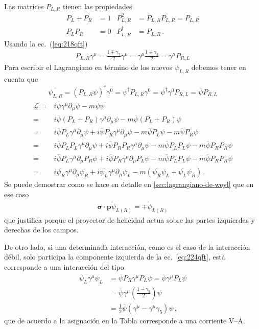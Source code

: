 Las matrices $P_{L,R}$ tienen las propiedades
\begin{align}
  P_L+P_R&=1 & P_{L,R}^2&=P_{L,R}P_{L,R}=P_{L,R}\nonumber\\
  P_L P_R&=0& P_{L,R}^\dagger&=P_{L,R}\,.
\end{align}
Usando la ec.~(\ref{eq:218qft})
\begin{align}
  P_{L,R}\gamma^\mu=\frac{1\mp\gamma_5}{2}\gamma^\mu=\gamma^\mu\frac{1\pm\gamma_5}{2}=\gamma^\mu P_{R,L}
\end{align}
Para escribir el Lagrangiano en término de los nuevos $\psi_{L,R}$ debemos tener en cuenta que
\begin{align}
  \overline{\psi_{L,R}}=(P_{L,R}\psi)^\dagger\gamma^0=\psi^\dagger P_{L,R}\gamma^0=\psi^\dagger\gamma^0P_{R,L}=\overline{\psi}P_{R,L}
\end{align}
\begin{align}
  \label{eq:221qft}
  \mathcal{L}=&i\overline{\psi}\gamma^\mu\partial_\mu\psi-m\overline{\psi}\psi\nonumber\\
  =&i\overline{\psi}(P_L+P_R)\gamma^\mu\partial_\mu\psi-m\overline{\psi}(P_L+P_R)\psi\nonumber\\
  =&i\overline{\psi}P_L\gamma^\mu\partial_\mu\psi+i\overline{\psi}P_R\gamma^\mu\partial_\mu\psi-m\overline{\psi}P_L\psi-m\overline{\psi}P_R\psi\nonumber\\
  =&i\overline{\psi}P_L P_L\gamma^\mu\partial_\mu\psi+i\overline{\psi}P_R P_R\gamma^\mu\partial_\mu\psi-m\overline{\psi}P_L P_L\psi-m\overline{\psi}P_R P_R\psi\nonumber\\
  =&i\overline{\psi}P_L\gamma^\mu\partial_\mu P_R\psi+i\overline{\psi}P_R\gamma^\mu\partial_\mu P_L\psi-m\overline{\psi}P_L P_L\psi-m\overline{\psi}P_R P_R\psi\nonumber\\
  =&i\overline{\psi_R}\gamma^\mu\partial_\mu\psi_R+i\overline{\psi_L}\gamma^\mu\partial_\mu\psi_L-m(\overline{\psi_R}\psi_L+\overline{\psi_L}\psi_R)\,.
\end{align}
Se puede demostrar como se hace en detalle en \ref{sec:lagrangiano-de-weyl} que en ese caso
\begin{align*}
   \boldsymbol{\sigma}\cdot \mathbf{p}\widetilde{\psi}_{L(R)}=\mp \widetilde{\psi}_{L(R)}
\end{align*}
que justifica porque el proyector de helicidad actua sobre las partes izquierdas y derechas de los campos.

De otro lado, si una determinada interacción, como es el caso de la interacción débil, solo participa la componente izquierda de la ec.~\eqref{eq:224qft}, está corresponde a una interacción del tipo
\begin{align}
  \overline{\psi}_L\gamma^\mu\psi_L&=\overline{\psi}P_R\gamma^\mu P_L\psi=\overline{\psi}\gamma^\mu P_L\psi\nonumber\\
  &=\overline{\psi}\gamma^\mu\left(\frac{1-\gamma_5}{2}\right)\psi\nonumber\\
  &=\tfrac{1}{2}\overline{\psi}\left(\gamma^\mu-\gamma^\mu\gamma_5\right)\psi\,,
\end{align}
que de acuerdo a la asignación en la Tabla corresponde a una corriente V--A.




